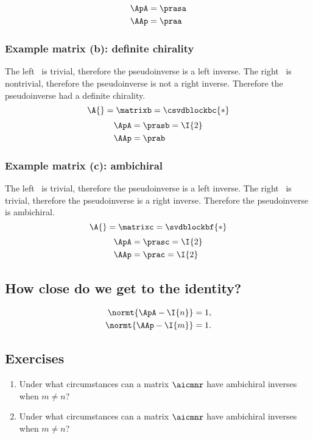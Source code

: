 \begin{equation}
  \begin{split}
    \ApA &= \prasa \\
    \AAp &= \praa
  \end{split}
\end{equation}

\subsubsection{Example matrix (b): definite chirality}
The left \ns \ is trivial, therefore the pseudoinverse is a left inverse.
The right \ns \ is nontrivial, therefore the pseudoinverse is not a right inverse.
Therefore the pseudoinverse had a definite chirality.
\begin{equation}
  \A{} = \matrixb = \csvdblockbc{*}
\end{equation}
\begin{equation}
  \begin{split}
    \ApA &= \prasb = \I{2} \\
    \AAp &= \prab
  \end{split}
\end{equation}

\subsubsection{Example matrix (c): ambichiral}
The left \ns \ is trivial, therefore the pseudoinverse is a left inverse.
The right \ns \ is trivial, therefore the pseudoinverse is a right inverse.
Therefore the pseudoinverse is ambichiral.
\begin{equation}
  \A{} = \matrixc = \svdblockbf{*}
\end{equation}
\begin{equation}
  \begin{split}
    \ApA &= \prasc = \I{2} \\
    \AAp &= \prac = \I{2}
  \end{split}
\end{equation}

\subsection{How close do we get to the identity?}

\begin{equation}
  \begin{split}
    \normt{ \ApA - \I{n} } &= 1, \\
    \normt{ \AAp - \I{m} } &= 1.
  \end{split}
\end{equation}

\subsection{Exercises}
\begin{enumerate}
%
\item Under what circumstances can a matrix $\aicmnr$ have ambichiral inverses when $m\ne n$?
%
\item Under what circumstances can a matrix $\aicmnr$ have ambichiral inverses when $m\ne n$?
%
\end{enumerate}



\endinput
